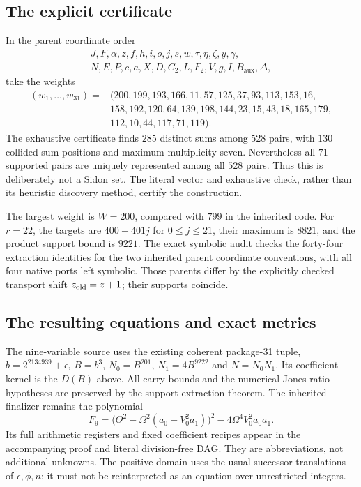 \subsection{The explicit certificate}

In the parent coordinate order
\[
\begin{gathered}
J,F,\alpha,z,f,h,i,o,j,s,w,\tau,\eta,\zeta,y,\gamma,\\
N,E,P,c,a,X,D,C_2,L,F_2,V,g,I,B_{\mathrm{aux}},\Delta,
\end{gathered}
\]
take the weights
\[
\begin{split}
(w_1,\ldots,w_{31})={}&(200,199,193,166,11,57,125,37,93,113,153,16,\\
&158,192,120,64,139,198,144,23,15,43,18,165,179,\\
&112,10,44,117,71,119).
\end{split}
\]
The exhaustive certificate finds $285$ distinct sums among $528$ pairs,
with $130$ collided sum positions and maximum multiplicity seven.
Nevertheless all $71$ supported pairs are uniquely represented among all
$528$ pairs. Thus this is deliberately not a Sidon set. The literal vector
and exhaustive check, rather than its heuristic discovery method, certify
the construction.

The largest weight is $W=200$, compared with $799$ in the inherited code.
For $r=22$, the targets are $400+401j$ for $0\le j\le21$, their maximum
is $8821$, and the product support bound is $9221$. The exact symbolic
audit checks the forty-four extraction identities for the two inherited
parent coordinate conventions, with all four native ports left symbolic.
Those parents differ by the explicitly checked transport shift
$z_{\rm old}=z+1$; their supports coincide.

\subsection{The resulting equations and exact metrics}

The nine-variable source uses the existing coherent package-31 tuple,
$b=2^{2134939}+\epsilon$, $B=b^3$,
$N_0=B^{201}$, $N_1=4B^{9222}$ and $N=N_0N_1$.
Its coefficient kernel is the $D(B)$ above. All carry bounds and the
numerical Jones ratio hypotheses are preserved by the support-extraction
theorem. The inherited finalizer remains the polynomial
\[
 F_9=\bigl(\Theta^2-\Omega^2(a_0+V_0^2a_1)\bigr)^2
       -4\Omega^4V_0^2a_0a_1.
\]
Its full arithmetic registers and fixed coefficient recipes appear in
the accompanying proof and literal division-free DAG. They are
abbreviations, not additional unknowns. The positive domain uses the
usual successor translations of $\epsilon,\phi,n$; it must not be
reinterpreted as an equation over unrestricted integers.

